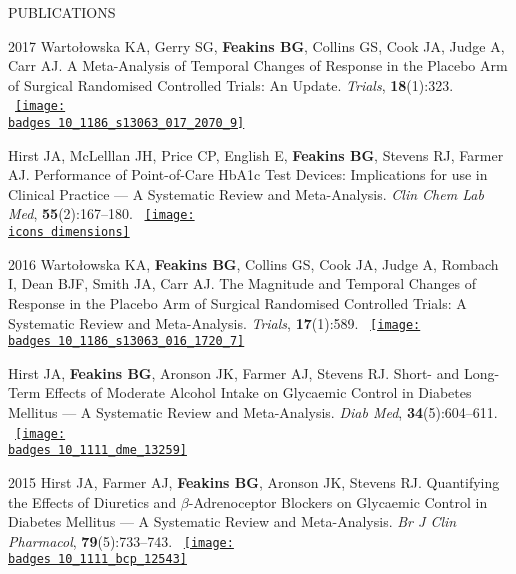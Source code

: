 \documentclass[10pt,a4paper]{article}
\def\badges{./badges/}
\def\icons{./icons/}
\begin{document}
\begin{cvlist}{PUBLICATIONS}
	\item[2017]
	Warto\l{}owska KA, Gerry SG, \textbf{Feakins BG}, Collins GS, Cook JA, Judge A, Carr AJ. A Meta-Analysis of Temporal Changes of Response in the Placebo Arm of Surgical Randomised Controlled Trials: An Update. \textit{Trials}, \textbf{18}(1):323. ~\href{https://biomedcentral.altmetric.com/details/21804060}{\texttt{[image: \\badges 10\_1186\_s13063\_017\_2070\_9]}}
	
	\item[]
	Hirst JA, McLelllan JH, Price CP, English E, \textbf{Feakins BG}, Stevens RJ, Farmer AJ. Performance of Point-of-Care HbA1c Test Devices: Implications for use in Clinical Practice --- A Systematic Review and Meta-Analysis. \textit{Clin Chem Lab Med}, \textbf{55}(2):167--180. ~\href{https://badge.dimensions.ai/details/id/pub.1036082624}{\texttt{[image: \\icons dimensions]}}
	
	\item[2016]
	Warto\l{}owska KA, \textbf{Feakins BG}, Collins GS, Cook JA, Judge A, Rombach I, Dean BJF, Smith JA, Carr AJ. The Magnitude and Temporal Changes of Response in the Placebo Arm of Surgical Randomised Controlled Trials: A Systematic Review and Meta-Analysis. \textit{Trials}, \textbf{17}(1):589. ~\href{https://biomedcentral.altmetric.com/details/14679542}{\texttt{[image: \\badges 10\_1186\_s13063\_016\_1720\_7]}}
	
	\item[]
	Hirst JA, \textbf{Feakins BG}, Aronson JK, Farmer AJ, Stevens RJ. Short- and Long-Term Effects of Moderate Alcohol Intake on Glycaemic Control in Diabetes Mellitus --- A Systematic Review and Meta-Analysis. \textit{Diab Med}, \textbf{34}(5):604--611. ~\href{https://wiley.altmetric.com/details/11898077}{\texttt{[image: \\badges 10\_1111\_dme\_13259]}}
	
	\item[2015]
	Hirst JA, Farmer AJ, \textbf{Feakins BG}, Aronson JK, Stevens RJ. Quantifying the Effects of Diuretics and $\beta$-Adrenoceptor Blockers on Glycaemic Control in Diabetes Mellitus --- A Systematic Review and Meta-Analysis. \textit{Br J Clin Pharmacol}, \textbf{79}(5):733--743. ~\href{https://wiley.altmetric.com/details/2869563}{\texttt{[image: \\badges 10\_1111\_bcp\_12543]}}
	
\end{cvlist}
\end{document}
